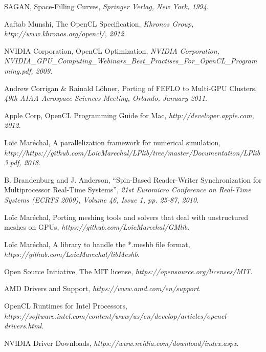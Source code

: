 \documentclass[a4paper,12pt]{article}
\begin{document}
%
%


\begin{thebibliography}{99}
\small

	SAGAN,
	Space-Filling Curves,
	\emph{Springer Verlag, New York, 1994}.

	Aaftab Munshi,
	The OpenCL Specification,
	\emph{Khronos Group, http://www.khronos.org/opencl/, 2012}.

	NVIDIA Corporation,
	OpenCL Optimization,
	\emph{NVIDIA Corporation, NVIDIA\_GPU\_Computing\_Webinars\_Best\_Practises\_For\_OpenCL\_Programming.pdf, 2009}.

	Andrew Corrigan \& Rainald Löhner,
	Porting of FEFLO to Multi-GPU Clusters,
	\emph{49th AIAA Aerospace Sciences Meeting, Orlando, January 2011}.

	Apple Corp,
	OpenCL Programming Guide for Mac,
	\emph{http://developer.apple.com, 2012}.

	Loïc Maréchal,
	A parallelization framework for numerical simulation,
	\emph{http://https://github.com/LoicMarechal/LPlib/tree/master/Documentation/LPlib3.pdf, 2018}.

   B. Brandenburg and J. Anderson,
   “Spin-Based Reader-Writer Synchronization for Multiprocessor Real-Time Systems”,
   \emph{21st Euromicro Conference on Real-Time Systems (ECRTS 2009), Volume 46, Issue 1, pp. 25-87, 2010}.

	Loïc Maréchal,
	Porting meshing tools and solvers that deal with unstructured meshes on GPUs,
	\emph{https://github.com/LoicMarechal/GMlib}.

	Loïc Maréchal,
	A library to handle the *.meshb file format,
	\emph{https://github.com/LoicMarechal/libMeshb}.

	Open Source Initiative,
	The MIT license,
	\emph{https://opensource.org/licenses/MIT}.

	AMD Drivers and Support,
	\emph{https://www.amd.com/en/support}.

	OpenCL Runtimes for Intel Processors,
	\emph{https://software.intel.com/content/www/us/en/develop/articles/opencl-drivers.html}.

	NVIDIA Driver Downloads,
	\emph{https://www.nvidia.com/download/index.aspx}.


\end{thebibliography}
\end{document}
